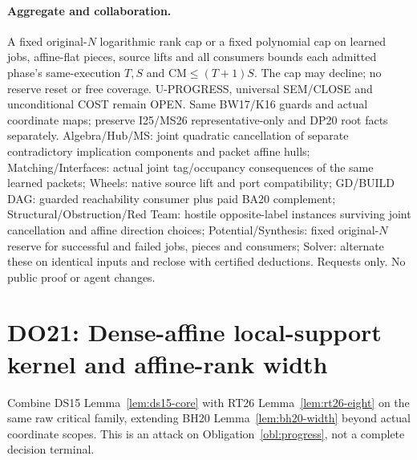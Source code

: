 \documentclass[11pt]{article}
\begin{document}
\paragraph{Aggregate and collaboration.}
A fixed original-$N$ logarithmic rank cap or a fixed polynomial cap on learned jobs, affine-flat pieces, source lifts and all consumers bounds each admitted phase's same-execution $T,S$ and $\mathrm{CM}\le(T+1)S$. The cap may decline; no reserve reset or free coverage. U-PROGRESS, universal SEM/CLOSE and unconditional COST remain OPEN. Same BW17/K16 guards and actual coordinate maps; preserve I25/MS26 representative-only and DP20 root facts separately. Algebra/Hub/MS: joint quadratic cancellation of separate contradictory implication components and packet affine hulls; Matching/Interfaces: actual joint tag/occupancy consequences of the same learned packets; Wheels: native source lift and port compatibility; GD/BUILD DAG: guarded reachability consumer plus paid BA20 complement; Structural/Obstruction/Red Team: hostile opposite-label instances surviving joint cancellation and affine direction choices; Potential/Synthesis: fixed original-$N$ reserve for successful and failed jobs, pieces and consumers; Solver: alternate these on identical inputs and reclose with certified deductions. Requests only. No public proof or agent changes.


\section{DO21: Dense-affine local-support kernel and affine-rank width}\label{sec:do21}
Combine DS15 Lemma~\ref{lem:ds15-core} with RT26 Lemma~\ref{lem:rt26-eight} on the same raw critical family, extending BH20 Lemma~\ref{lem:bh20-width} beyond actual coordinate scopes. This is an attack on Obligation~\ref{obl:progress}, not a complete decision terminal.
\end{document}
